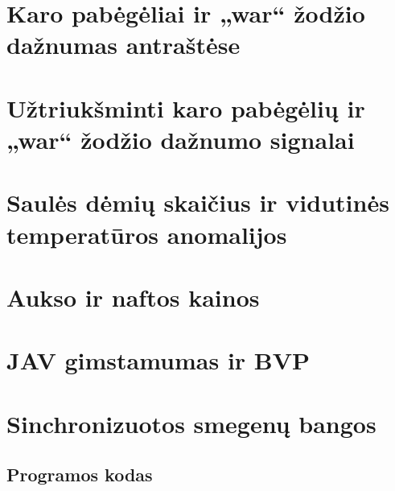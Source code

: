 \documentclass[a4paper,12pt,fleqn]{article}
\begin{document}
    {}{}{}{}%
    {}

    \tableofcontents

    

    \section{Karo pabėgėliai ir „war“ žodžio dažnumas antraštėse}
    \label{sec:refugees}
    

    \section{Užtriukšminti karo pabėgėlių ir „war“ žodžio dažnumo signalai}
    \label{sec:noisy-refugees}
    

    \section{Saulės dėmių skaičius ir vidutinės temperatūros anomalijos}
    \label{sec:sunspots}
    

    \section{Aukso ir naftos kainos}
    \label{sec:oil-gold}
    

    \section{JAV gimstamumas ir BVP}
    \label{sec:gdp-births}
    

    \section{Sinchronizuotos smegenų bangos}
    \label{sec:brainwaves}
    

    


    \newpage
    \begin{appendices}
        \section{Programos kodas}
        \label{app:code}
        
    \end{appendices}
\end{document}
